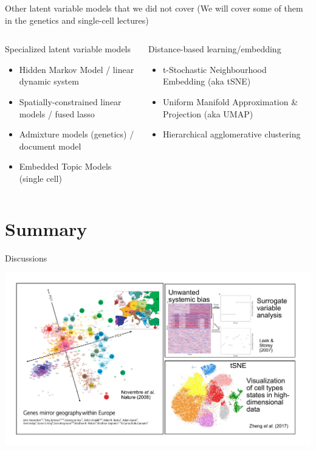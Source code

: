 \documentclass[
  ignorenonframetext,
  aspectratio=169]{beamer}
\begin{document}
\begin{frame}{Other latent variable models that we did not cover}
\protect\hypertarget{other-latent-variable-models-that-we-did-not-cover}{}
(We will cover some of them in the genetics and single-cell lectures)

\begin{columns}[T]
\begin{column}{.45\textwidth}
\begin{block}{Specialized latent variable models}
\protect\hypertarget{specialized-latent-variable-models}{}
\begin{itemize}
\item
  Hidden Markov Model / linear dynamic system
\item
  Spatially-constrained linear models / fused lasso
\item
  Admixture models (genetics) / document model
\item
  Embedded Topic Models (single cell)
\end{itemize}
\end{block}
\end{column}

\begin{column}{.45\textwidth}
\begin{block}{Distance-based learning/embedding}
\protect\hypertarget{distance-based-learningembedding}{}
\begin{itemize}
\item
  t-Stochastic Neighbourhood Embedding (aka tSNE)
\item
  Uniform Manifold Approximation \& Projection (aka UMAP)
\item
  Hierarchical agglomerative clustering
\end{itemize}
\end{block}
\end{column}
\end{columns}
\end{frame}

\hypertarget{summary}{%
\section{Summary}\label{summary}}

\begin{frame}{Discussions}
\protect\hypertarget{discussions}{}
\end{frame}

\begin{frame}{}
\protect\hypertarget{section-2}{}
\includegraphics{Vis/unsupervised/why_unsupervised_learning.pdf}
\end{frame}
\end{document}
